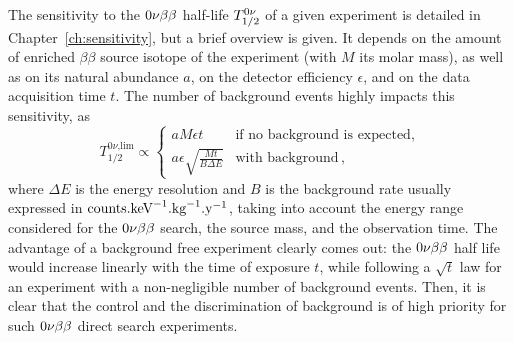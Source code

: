 The sensitivity to the $0\nu\beta\beta$ half-life $T_{1/2}^{0\nu}$ of a given experiment is detailed in Chapter~\ref{ch:sensitivity}, but a brief overview is given.
It depends on the amount of enriched $\beta\beta$ source isotope of the experiment (with $M$ its molar mass), as well as on its natural abundance $a$, on the detector efficiency $\epsilon$, and on the data acquisition time $t$.
The number of background events highly impacts this sensitivity, as
\begin{equation}
  T_{1/2}^{0\nu\text{,lim}} \propto \left\{
  \begin{array}{ll}
    a M \epsilon t & \text{if no background is expected,} \\
    a \epsilon \sqrt{\frac{M t}{B \Delta E}} & \text{with background}\,,
  \end{array}
  \right.
  \label{eq:sensitivity_background}
\end{equation}
where $\Delta E$ is the energy resolution and $B$ is the background rate usually expressed in $\text{counts.keV}^{-1}\text{.kg}^{-1}\text{.y}^{-1}$, taking into account the energy range considered for the $0\nu\beta\beta$ search, the source mass, and the observation time.
The advantage of a background free experiment clearly comes out: the $0\nu\beta\beta$ half life would increase linearly with the time of exposure $t$, while following a $\sqrt t$ law for an experiment with a non-negligible number of background events.
Then, it is clear that the control and the discrimination of background is of high priority for such $0\nu\beta\beta$ direct search experiments.


